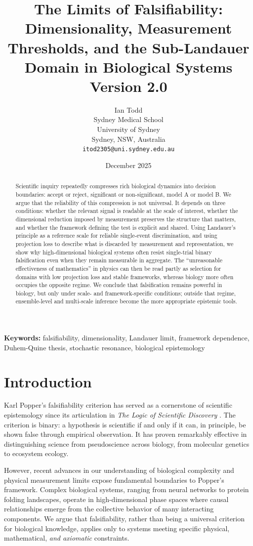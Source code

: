 \documentclass[12pt]{article}
\title{The Limits of Falsifiability: Dimensionality, Measurement Thresholds, and the Sub-Landauer Domain in Biological Systems\\[0.5em]\large Version 2.0}
\author{Ian Todd\\
Sydney Medical School\\
University of Sydney\\
Sydney, NSW, Australia\\
\texttt{itod2305@uni.sydney.edu.au}}
\date{December 2025}
\begin{document}
\maketitle

\begin{abstract}
Scientific inquiry repeatedly compresses rich biological dynamics into decision boundaries: accept or reject, significant or non-significant, model A or model B. We argue that the reliability of this compression is not universal. It depends on three conditions: whether the relevant signal is readable at the scale of interest, whether the dimensional reduction imposed by measurement preserves the structure that matters, and whether the framework defining the test is explicit and shared. Using Landauer's principle as a reference scale for reliable single-event discrimination, and using projection loss to describe what is discarded by measurement and representation, we show why high-dimensional biological systems often resist single-trial binary falsification even when they remain measurable in aggregate. The ``unreasonable effectiveness of mathematics'' in physics can then be read partly as selection for domains with low projection loss and stable frameworks, whereas biology more often occupies the opposite regime. We conclude that falsification remains powerful in biology, but only under scale- and framework-specific conditions; outside that regime, ensemble-level and multi-scale inference become the more appropriate epistemic tools.
\end{abstract}

\textbf{Keywords:} falsifiability, dimensionality, Landauer limit, framework dependence, Duhem-Quine thesis, stochastic resonance, biological epistemology

\section{Introduction}

Karl Popper's falsifiability criterion has served as a cornerstone of scientific epistemology since its articulation in \textit{The Logic of Scientific Discovery} \cite{popper1959}. The criterion is binary: a hypothesis is scientific if and only if it can, in principle, be shown false through empirical observation. It has proven remarkably effective in distinguishing science from pseudoscience across biology, from molecular genetics to ecosystem ecology.

However, recent advances in our understanding of biological complexity and physical measurement limits expose fundamental boundaries to Popper's framework. Complex biological systems, ranging from neural networks to protein folding landscapes, operate in high-dimensional phase spaces where causal relationships emerge from the collective behavior of many interacting components. We argue that falsifiability, rather than being a universal criterion for biological knowledge, applies only to systems meeting specific physical, mathematical, \emph{and axiomatic} constraints.
\end{document}

